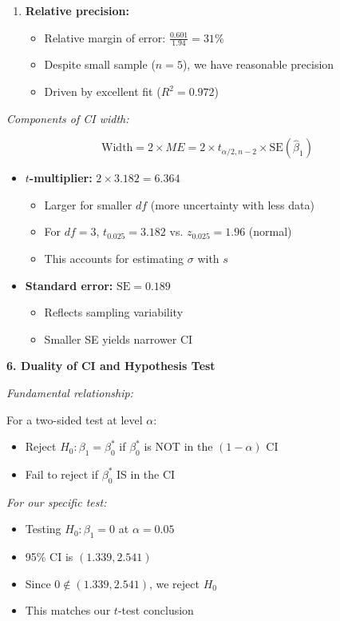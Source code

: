 \documentclass[12pt]{article}
\begin{document}
\begin{explanation}
\begin{enumerate}
    \item \textbf{Relative precision:}
    \begin{itemize}
        \item Relative margin of error: $\frac{0.601}{1.94} = 31\%$
        \item Despite small sample ($n = 5$), we have reasonable precision
        \item Driven by excellent fit ($R^2 = 0.972$)
    \end{itemize}
\end{enumerate}

\textit{Components of CI width:}

\[
\text{Width} = 2 \times ME = 2 \times t_{\alpha/2, n-2} \times \text{SE}(\hat{\beta}_1)
\]

\begin{itemize}
    \item \textbf{$t$-multiplier:} $2 \times 3.182 = 6.364$
    \begin{itemize}
        \item Larger for smaller $df$ (more uncertainty with less data)
        \item For $df = 3$, $t_{0.025} = 3.182$ vs. $z_{0.025} = 1.96$ (normal)
        \item This accounts for estimating $\sigma$ with $s$
    \end{itemize}

    \item \textbf{Standard error:} $\text{SE} = 0.189$
    \begin{itemize}
        \item Reflects sampling variability
        \item Smaller SE yields narrower CI
    \end{itemize}
\end{itemize}

\textbf{6. Duality of CI and Hypothesis Test}

\textit{Fundamental relationship:}

For a two-sided test at level $\alpha$:
\begin{itemize}
    \item Reject $H_0: \beta_1 = \beta_0^*$ if $\beta_0^*$ is NOT in the $(1-\alpha)$ CI
    \item Fail to reject if $\beta_0^*$ IS in the CI
\end{itemize}

\textit{For our specific test:}

\begin{itemize}
    \item Testing $H_0: \beta_1 = 0$ at $\alpha = 0.05$
    \item 95\% CI is $(1.339, 2.541)$
    \item Since $0 \notin (1.339, 2.541)$, we reject $H_0$
    \item This matches our $t$-test conclusion
\end{itemize}


\end{explanation}
\end{document}
